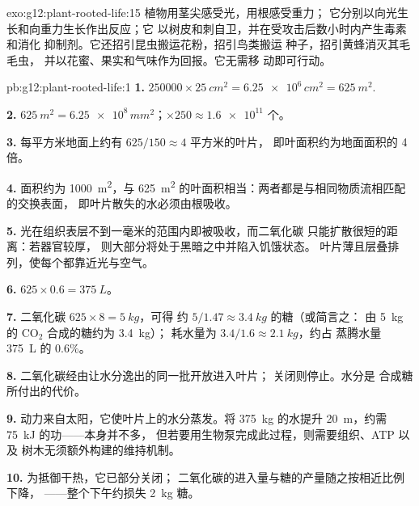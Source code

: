 \begin{solution}{exo:g12:plant-rooted-life:15}
植物用茎尖感受光，用根感受重力；
它分别以向光生长和向重力生长作出反应；它
以树皮和刺自卫，并在受攻击后数小时内产生毒素和消化
抑制剂。它还招引昆虫搬运花粉，招引鸟类搬运
种子，招引黄蜂消灭其毛毛虫，
并以花蜜、果实和气味作为回报。它无需移
动即可行动。
\end{solution}

\begin{solution}{pb:g12:plant-rooted-life:1}
\textbf{1.} $\num{250000} \times \qty{25}{cm^2} = \num{6.25e6}\,
\unit{cm^2} = \qty{625}{m^2}$.

\textbf{2.} $\qty{625}{m^2} = \num{6.25e8}\,\unit{mm^2}$；$\times 250
\approx \num{1.6e11}$ 个。

\textbf{3.} 每平方米地面上约有 $625/150 \approx 4$ 平方米的叶片，
即叶面积约为地面面积的 4 倍。

\textbf{4.} 面积约为 \qty{1000}{m^2}，与 \qty{625}{m^2}
的叶面积相当：两者都是与相同物质流相匹配的交换表面，
即叶片散失的水必须由根吸收。

\textbf{5.} 光在组织表层不到一毫米的范围内即被吸收，而二氧化碳
只能扩散很短的距离：若器官较厚，
则大部分将处于黑暗之中并陷入饥饿状态。
叶片薄且层叠排列，使每个都靠近光与空气。

\textbf{6.} $625 \times 0.6 = \qty{375}{L}$。

\textbf{7.} 二氧化碳 $625 \times 8 = \qty{5}{kg}$，可得
约 $5/1.47 \approx \qty{3.4}{kg}$ 的糖（或简言之：
由 \qty{5}{kg} 的 $\mathrm{CO_2}$ 合成的糖约为 \qty{3.4}{kg}）；
耗水量为 $3.4/1.6 \approx \qty{2.1}{kg}$，约占
蒸腾水量 \qty{375}{L} 的 0.6\%。

\textbf{8.} 二氧化碳经由让水分逸出的同一批开放进入叶片；
关闭则停止。水分是
合成糖所付出的代价。

\textbf{9.} 动力来自太阳，它使叶片上的水分蒸发。将
\qty{375}{kg} 的水提升 \qty{20}{m}，约需 \qty{75}{kJ} 的功——本身并不多，
但若要用生物泵完成此过程，则需要组织、ATP 以及
树木无须额外构建的维持机制。

\textbf{10.} 为抵御干热，它已部分关闭；
二氧化碳的进入量与糖的产量随之按相近比例下降，
——整个下午约损失 \qty{2}{kg} 糖。


\end{solution}
